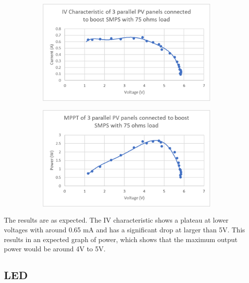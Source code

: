 \begin{figure}
    \centering
    \begin{subfigure}[b]{.45\linewidth}
        \includegraphics[width=\linewidth]{images/iv-3-load.png}
    \end{subfigure}
    \begin{subfigure}[b]{.45\linewidth}
        \includegraphics[width=\linewidth]{images/mppt-3-load.png}
    \end{subfigure}
    \caption{}
    \label{fig:mppt-load}
\end{figure}

The results are as expected. The IV characteristic shows a plateau at lower voltages with around 0.65 mA and has a significant drop at larger than 5V. This results in an expected graph of power, which shows that the maximum output power would be around 4V to 5V.

\subsection{LED}


